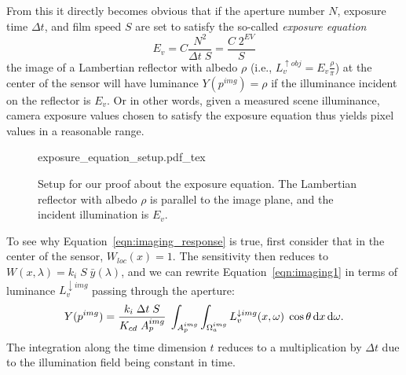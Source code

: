From this it directly becomes obvious that if the aperture number $N$,
\gls{exposure time} $\Delta t$, and \gls{film speed} $S$ are set to satisfy the
so-called \emph{exposure equation}
\begin{equation}\label{eqn:imaging_Ev}
E_v = C \frac{N^2}{\Delta t\; S} = \frac{C\; 2^{EV}}S
\end{equation}
the image of a Lambertian reflector with albedo $\rho$ (i.e.,
$L_v^{\uparrow obj} = E_v \frac \rho \pi$) at the center of the sensor
will have luminance $Y(p^{img}) = \rho$ if the illuminance incident on
the reflector is $E_v$. Or in other words, given a measured scene
illuminance, camera exposure values chosen to satisfy the exposure
equation thus yields pixel values in a reasonable range.

\begin{figure}[t]
    \centering
    \def\svgwidth{0.9\linewidth}
    {exposure_equation_setup.pdf_tex}
    \caption{\label{fig:exposure_equation_setup}%
        Setup for our proof about the exposure equation. The Lambertian reflector with albedo $\rho$ is parallel to 
        the image plane, and the incident illumination is $E_v$. }
\end{figure}

To see why Equation~\eqref{eqn:imaging_response} is true, first consider that in the center of the sensor,
$W_{loc}(x) = 1$. The sensitivity then reduces to $W(x,\lambda) = k_i\;S\;\bar y(\lambda)$,
and we can rewrite Equation~\eqref{eqn:imaging1} in terms of luminance
$L_v^{\downarrow img}$ passing through the aperture:
\begin{equation}\label{eqn:imaging_y}
Y(p^{img}) 
           = \frac{k_i\; \Delta t \; S}{K_{cd}\;A^{img}_p} \;
             \int_{A_p^{img}} 
             \int_{\Omega_a^{img}} 
                L^{\downarrow img}_{v}(x, \omega) \;
                \cos\theta \mathop{}\!\mathrm{d} x \mathop{}\!\mathrm{d}\omega.
\end{equation}
The integration along the time dimension $t$ reduces to a multiplication
by $\Delta t$ due to the illumination field being constant in time. 

%

